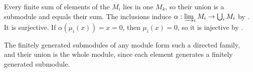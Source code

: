 Every finite sum of elements of the $M_i$ lies in one $M_k$, so their union is a submodule and equals their sum. The inclusions induce $\alpha:\varinjlim_iM_i\to\bigcup_iM_i$ by . It is surjective. If $\alpha(\mu_i(x))=x=0$, then $\mu_i(x)=0$, so it is injective by .

The finitely generated submodules of any module form such a directed family, and their union is the whole module, since each element generates a finitely generated submodule.
